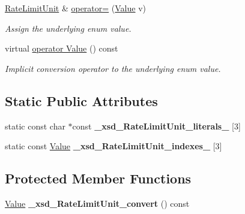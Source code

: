 \begin{DoxyCompactItemize}
\hyperlink{classopenstack_1_1xml_1_1RateLimitUnit}{RateLimitUnit} \& \hyperlink{classopenstack_1_1xml_1_1RateLimitUnit_a20e4d9e828925a70d0a86f52b3082cae}{operator=} (\hyperlink{classopenstack_1_1xml_1_1RateLimitUnit_a0851d305ebaa03a6afb5335fbcd70b35}{Value} v)
\begin{DoxyCompactList}\small\item\em Assign the underlying enum value. \item\end{DoxyCompactList}\item 
virtual \hyperlink{classopenstack_1_1xml_1_1RateLimitUnit_a690975f1f715b612058a9a7689d24dd6}{operator Value} () const 
\begin{DoxyCompactList}\small\item\em Implicit conversion operator to the underlying enum value. \item\end{DoxyCompactList}\end{DoxyCompactItemize}
\subsection*{Static Public Attributes}
\begin{DoxyCompactItemize}
\item 
\hypertarget{classopenstack_1_1xml_1_1RateLimitUnit_a7ca5245d98c2e63020a027dd9f1e6972}{
static const char $\ast$const {\bfseries \_\-xsd\_\-RateLimitUnit\_\-literals\_\-} \mbox{[}3\mbox{]}}
\label{classopenstack_1_1xml_1_1RateLimitUnit_a7ca5245d98c2e63020a027dd9f1e6972}

\item 
\hypertarget{classopenstack_1_1xml_1_1RateLimitUnit_afb227ceda04c1fdbace4f9500bc0f060}{
static const \hyperlink{classopenstack_1_1xml_1_1RateLimitUnit_a0851d305ebaa03a6afb5335fbcd70b35}{Value} {\bfseries \_\-xsd\_\-RateLimitUnit\_\-indexes\_\-} \mbox{[}3\mbox{]}}
\label{classopenstack_1_1xml_1_1RateLimitUnit_afb227ceda04c1fdbace4f9500bc0f060}

\end{DoxyCompactItemize}
\subsection*{Protected Member Functions}
\begin{DoxyCompactItemize}
\item 
\hypertarget{classopenstack_1_1xml_1_1RateLimitUnit_a1202f4e9a39413bfdfd8570029fd8316}{
\hyperlink{classopenstack_1_1xml_1_1RateLimitUnit_a0851d305ebaa03a6afb5335fbcd70b35}{Value} {\bfseries \_\-xsd\_\-RateLimitUnit\_\-convert} () const }
\label{classopenstack_1_1xml_1_1RateLimitUnit_a1202f4e9a39413bfdfd8570029fd8316}

\end{DoxyCompactItemize}


